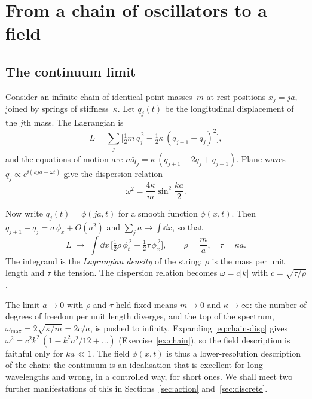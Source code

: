 \section{From a chain of oscillators to a field}
\label{sec:chain}

\subsection{The continuum limit}

Consider an infinite chain of identical point masses~$m$ at rest positions
$x_j = ja$, joined by springs of stiffness~$\kappa$. Let $q_j(t)$ be the
longitudinal displacement of the $j$th mass. The Lagrangian is
\begin{equation}
  L=\sum_j\Big[\tfrac12 m\,\dot q_j^{\,2}-\tfrac12\kappa\,(q_{j+1}-q_j)^2\Big],
  \label{eq:chain-L}
\end{equation}
and the equations of motion are $m\ddot q_j=\kappa\,(q_{j+1}-2q_j+q_{j-1})$.
Plane waves $q_j\propto e^{\ii(kja-\omega t)}$ give the dispersion relation
\begin{equation}
  \omega^2=\frac{4\kappa}{m}\sin^2\frac{ka}{2}.
  \label{eq:chain-disp}
\end{equation}

Now write $q_j(t)=\phi(ja,t)$ for a smooth function $\phi(x,t)$. Then
$q_{j+1}-q_j=a\,\phi_x+O(a^2)$ and $\sum_j a\to\int\!\dd x$, so that
\begin{equation}
  L\;\longrightarrow\;\int\!\dd x\,\Big[\tfrac12\rho\,\phi_t^{\,2}-\tfrac12\tau\,\phi_x^{\,2}\Big],
  \qquad \rho=\frac{m}{a},\quad \tau=\kappa a .
  \label{eq:string-L}
\end{equation}
The integrand is the \emph{Lagrangian density} of the string: $\rho$ is the mass
per unit length and $\tau$ the tension. The dispersion relation becomes
$\omega=c|k|$ with $c=\sqrt{\tau/\rho}$.

\begin{remark}
The limit $a\to0$ with $\rho$ and $\tau$ held fixed means $m\to0$ and
$\kappa\to\infty$: the number of degrees of freedom per unit length diverges, and
the top of the spectrum, $\omega_{\max}=2\sqrt{\kappa/m}=2c/a$, is pushed to
infinity. Expanding \eqref{eq:chain-disp} gives
$\omega^2=c^2k^2\,(1-k^2a^2/12+\dots)$ (Exercise~\ref{ex:chain}), so the field
description is faithful only for $ka\ll1$. The field $\phi(x,t)$ is thus a
lower-resolution description of the chain: the continuum is an idealisation
that is excellent for long wavelengths and wrong, in a controlled way, for
short ones. We shall meet two further manifestations of this in
Sections~\ref{sec:action} and~\ref{sec:discrete}.
\end{remark}

